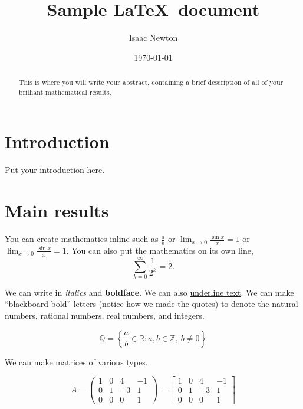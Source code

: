 \documentclass[12pt]{amsart}
\theoremstyle{plain}
\theoremstyle{definition}
\begin{document}
\title{Sample \LaTeX\  document}

\author{Isaac Newton} \address{Dickinson College\\ Carlisle, PA 17013}


\date{\today}
\begin{abstract}
This is where you will write your abstract, containing a brief description of all of your brilliant mathematical results.
\end{abstract}

\maketitle
\section{Introduction}\label{sec:intro}
Put       your          introduction        here.


\section{Main results}\label{sec:main}

You can create mathematics inline such as $\frac{a}{b}$ or $\lim_{x\to 0}\frac{\sin x}{x}=1$ or $\displaystyle\lim_{x\to 0}\frac{\sin x}{x}=1$. You can also put the mathematics on its own line, \[\sum_{k=0}^\infty \frac{1}{2^k}=2.\]


We can write in \emph{italics} and \textbf{boldface}. We can also \underline{underline text}. We can make ``blackboard bold'' letters (notice how we made the quotes) to denote the natural numbers, rational numbers, real numbers, and integers.

\[\mathbb{Q}=\left\{\frac{a}{b}\in\mathbb{R}:a,b\in\mathbb{Z},\ b\ne 0\right\}\]

We can make matrices of various types.

\[A=\left(\begin{array}{cccc}
1 &0 &4 &-1\\
0 &1 &-3 &1 \\
0 &0 &0 &1
\end{array}\right)=
\left[\begin{array}{cccc}
1 &0 &4 &-1\\
0 &1 &-3 &1 \\
0 &0 &0 &1
\end{array}\right]\]
\end{document}
